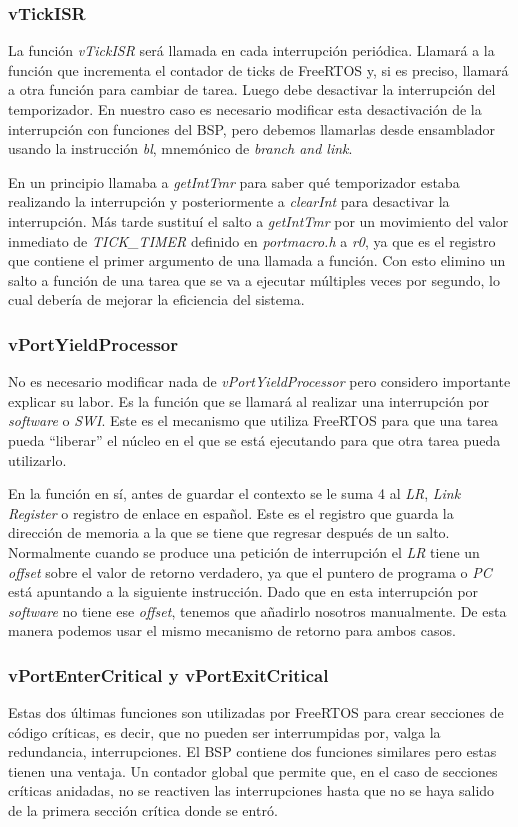 \subsubsection{vTickISR}
La función \emph{vTickISR} será llamada en cada interrupción periódica. Llamará a la función que incrementa el contador de ticks de FreeRTOS y, si es preciso, llamará a otra función para cambiar de tarea. Luego debe desactivar la interrupción del temporizador. En nuestro caso es necesario modificar esta desactivación de la interrupción con funciones del BSP, pero debemos llamarlas desde ensamblador usando la instrucción \emph{bl}, mnemónico de \emph{branch and link}.

En un principio llamaba a \emph{getIntTmr} para saber qué temporizador estaba realizando la interrupción y posteriormente a \emph{clearInt} para desactivar la interrupción. Más tarde sustituí el salto a \emph{getIntTmr} por un movimiento del valor inmediato de \emph{TICK\_TIMER} definido en \emph{portmacro.h} a \emph{r0}, ya que es el registro que contiene el primer argumento de una llamada a función. Con esto elimino un salto a función de una tarea que se va a ejecutar múltiples veces por segundo, lo cual debería de mejorar la eficiencia del sistema.

\subsubsection{vPortYieldProcessor}
No es necesario modificar nada de \emph{vPortYieldProcessor} pero considero importante explicar su labor. Es la función que se llamará al realizar una interrupción por \emph{software} o \emph{SWI}. Este es el mecanismo que utiliza FreeRTOS para que una tarea pueda ``liberar'' el núcleo en el que se está ejecutando para que otra tarea pueda utilizarlo.

En la función en sí, antes de guardar el contexto se le suma 4 al \emph{LR}, \emph{Link Register} o registro de enlace en español. Este es el registro que guarda la dirección de memoria a la que se tiene que regresar después de un salto. Normalmente cuando se produce una petición de interrupción el \emph{LR} tiene un \emph{offset} sobre el valor de retorno verdadero, ya que el puntero de programa o \emph{PC} está apuntando a la siguiente instrucción. Dado que en esta interrupción por \emph{software} no tiene ese \emph{offset}, tenemos que añadirlo nosotros manualmente. De esta manera podemos usar el mismo mecanismo de retorno para ambos casos.

\subsubsection{vPortEnterCritical y vPortExitCritical}
Estas dos últimas funciones son utilizadas por FreeRTOS para crear secciones de código críticas, es decir, que no pueden ser interrumpidas por, valga la redundancia, interrupciones. El BSP contiene dos funciones similares pero estas tienen una ventaja. Un contador global que permite que, en el caso de secciones críticas anidadas, no se reactiven las interrupciones hasta que no se haya salido de la primera sección crítica donde se entró.

